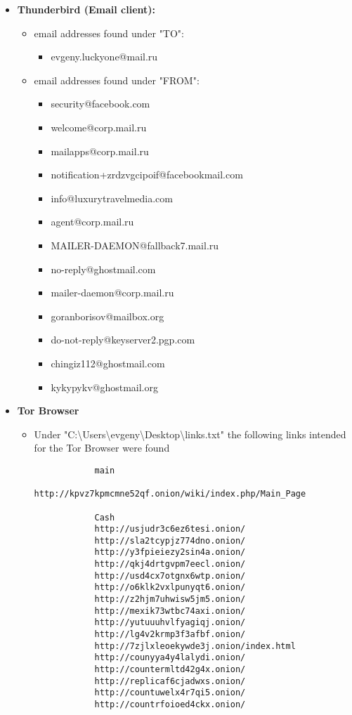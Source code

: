 \begin{enumerate}
\begin{itemize}
\begin{itemize}
		
		\item \textbf{Thunderbird (Email client):} 
		\begin{itemize}
			\item email addresses found under "TO":
			\begin{itemize}
				\item evgeny.luckyone@mail.ru
			\end{itemize}
			\item email addresses found under "FROM":
			\begin{itemize}
				\item security@facebook.com
				\item welcome@corp.mail.ru
				\item mailapps@corp.mail.ru
				\item notification+zrdzvgcipoif@facebookmail.com
				\item info@luxurytravelmedia.com
				\item agent@corp.mail.ru
				\item MAILER-DAEMON@fallback7.mail.ru
				\item no-reply@ghostmail.com
				\item mailer-daemon@corp.mail.ru
				\item goranborisov@mailbox.org
				\item do-not-reply@keyserver2.pgp.com
				\item chingiz112@ghostmail.com
				\item kykypykv@ghostmail.org
			\end{itemize}
			
		\end{itemize}
		
		\item \textbf{Tor Browser}
		\begin{itemize}
			\item Under "C:\textbackslash Users\textbackslash evgeny\textbackslash Desktop\textbackslash links.txt" the following links intended for the Tor Browser were found
			
			\begin{verbatim}
			main
			http://kpvz7kpmcmne52qf.onion/wiki/index.php/Main_Page
			
			Cash
			http://usjudr3c6ez6tesi.onion/
			http://sla2tcypjz774dno.onion/
			http://y3fpieiezy2sin4a.onion/
			http://qkj4drtgvpm7eecl.onion/
			http://usd4cx7otgnx6wtp.onion/
			http://o6klk2vxlpunyqt6.onion/
			http://z2hjm7uhwisw5jm5.onion/
			http://mexik73wtbc74axi.onion/
			http://yutuuuhvlfyagiqj.onion/
			http://lg4v2krmp3f3afbf.onion/
			http://7zjlxleoekywde3j.onion/index.html
			http://counyya4y4lalydi.onion/
			http://countermltd42g4x.onion/
			http://replicaf6cjadwxs.onion/
			http://countuwelx4r7qi5.onion/
			http://countrfoioed4ckx.onion/
			

\end{verbatim}
\end{itemize}
\end{itemize}
\end{itemize}
\end{enumerate}
